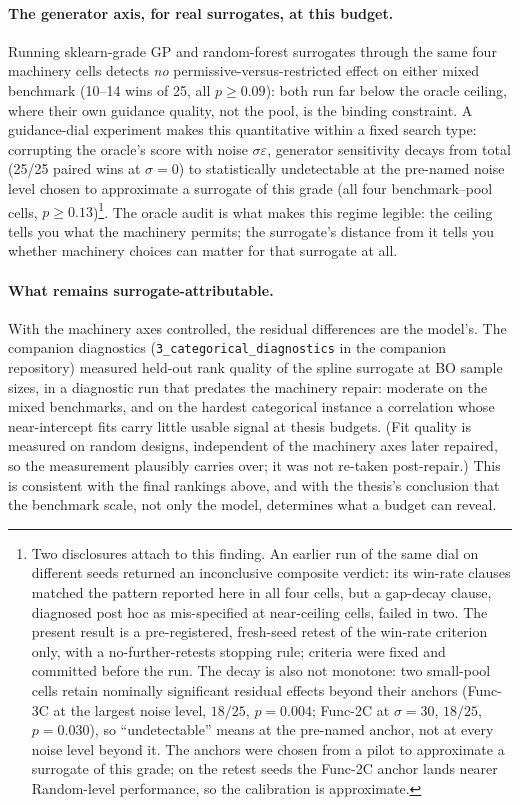 \documentclass[%
 aip,
 amsmath,amssymb,
 floatfix,
 reprint,%
]{revtex4-1}
\begin{document}
\paragraph{The generator axis, for real surrogates, at this budget.}
Running sklearn-grade GP and random-forest surrogates through the same
four machinery cells detects \emph{no} permissive-versus-restricted effect on either
mixed benchmark (10--14 wins of 25, all $p \ge 0.09$): both run far
below the oracle ceiling, where their own guidance quality, not the
pool, is the binding constraint. A guidance-dial experiment makes
this quantitative within a fixed search type: corrupting the oracle's
score with noise $\sigma\varepsilon$, generator sensitivity decays from
total (25/25 paired wins at $\sigma{=}0$) to statistically undetectable
at the pre-named noise level chosen to approximate a surrogate of
this grade (all four benchmark--pool cells,
$p \ge 0.13$)\footnote{Two disclosures attach to this finding. An
earlier run of the same dial on different seeds returned an inconclusive
composite verdict: its win-rate clauses matched the pattern reported
here in all four cells, but a gap-decay clause, diagnosed post hoc as
mis-specified at near-ceiling cells, failed in two. The present
result is a pre-registered, fresh-seed retest of the win-rate criterion
only, with a no-further-retests stopping rule; criteria were fixed and
committed before the run. The decay is also not monotone: two
small-pool cells retain nominally significant residual effects beyond
their anchors (Func-3C at the largest noise level, $18/25$, $p = 0.004$;
Func-2C at $\sigma{=}30$, $18/25$, $p = 0.030$), so ``undetectable''
means at the pre-named anchor, not at every noise level beyond it.
The anchors were chosen from a pilot to approximate a surrogate of this
grade; on the retest seeds the Func-2C anchor lands nearer Random-level
performance, so the calibration is approximate.}.
The oracle audit is what makes this regime legible: the ceiling tells
you what the machinery permits; the surrogate's distance from it tells
you whether machinery choices can matter for that surrogate at all.

\paragraph{What remains surrogate-attributable.}
With the machinery axes controlled, the residual differences are the
model's. The companion diagnostics
(\texttt{3\_categorical\_diagnostics} in the companion repository)
measured held-out rank quality of the spline surrogate at BO sample
sizes, in a diagnostic run that predates the machinery repair: moderate
on the mixed benchmarks, and on the hardest categorical instance a
correlation whose near-intercept fits carry little usable signal at
thesis budgets. (Fit quality is measured on random designs, independent
of the machinery axes later repaired, so the measurement plausibly
carries over; it was not re-taken post-repair.) This is consistent with
the final rankings above, and with the thesis's conclusion that the
benchmark scale, not only the model, determines what a budget can
reveal.
\end{document}
